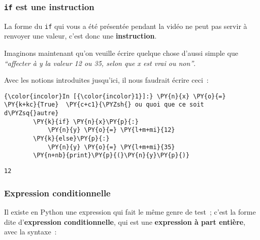     \hypertarget{if-est-une-instruction}{%
\subsubsection{\texorpdfstring{\texttt{if} est une
instruction}{if est une instruction}}\label{if-est-une-instruction}}

    La forme du \texttt{if} qui vous a été présentée pendant la vidéo ne
peut pas servir à renvoyer une valeur, c'est donc une
\textbf{instruction}.

    Imaginons maintenant qu'on veuille écrire quelque chose d'aussi simple
que \emph{``affecter à y la valeur 12 ou 35, selon que x est vrai ou
non''}.

    Avec les notions introduites jusqu'ici, il nous faudrait écrire ceci~:

    \begin{Verbatim}[commandchars=\\\{\},frame=single,framerule=0.3mm,rulecolor=\color{cellframecolor}]
{\color{incolor}In [{\color{incolor}1}]:} \PY{n}{x} \PY{o}{=} \PY{k+kc}{True}  \PY{c+c1}{\PYZsh{} ou quoi que ce soit d\PYZsq{}autre}
        \PY{k}{if} \PY{n}{x}\PY{p}{:}
            \PY{n}{y} \PY{o}{=} \PY{l+m+mi}{12}
        \PY{k}{else}\PY{p}{:}
            \PY{n}{y} \PY{o}{=} \PY{l+m+mi}{35}
        \PY{n+nb}{print}\PY{p}{(}\PY{n}{y}\PY{p}{)}
\end{Verbatim}


    \begin{Verbatim}[commandchars=\\\{\},frame=single,framerule=0.3mm,rulecolor=\color{cellframecolor}]
12
\end{Verbatim}

    \hypertarget{expression-conditionnelle}{%
\subsubsection{Expression
conditionnelle}\label{expression-conditionnelle}}

    Il existe en Python une expression qui fait le même genre de test~;
c'est la forme dite d'\textbf{expression conditionnelle}, qui est une
\textbf{expression à part entière}, avec la syntaxe~:

\begin{Shaded}
\begin{Highlighting}[frame=lines,framerule=0.6mm,rulecolor=\color{asisframecolor}]
\OperatorTok{<}\OperatorTok{>}  \OperatorTok{<}\OperatorTok{>}  \OperatorTok{<}\OperatorTok{>}
\end{Highlighting}
\end{Shaded}

